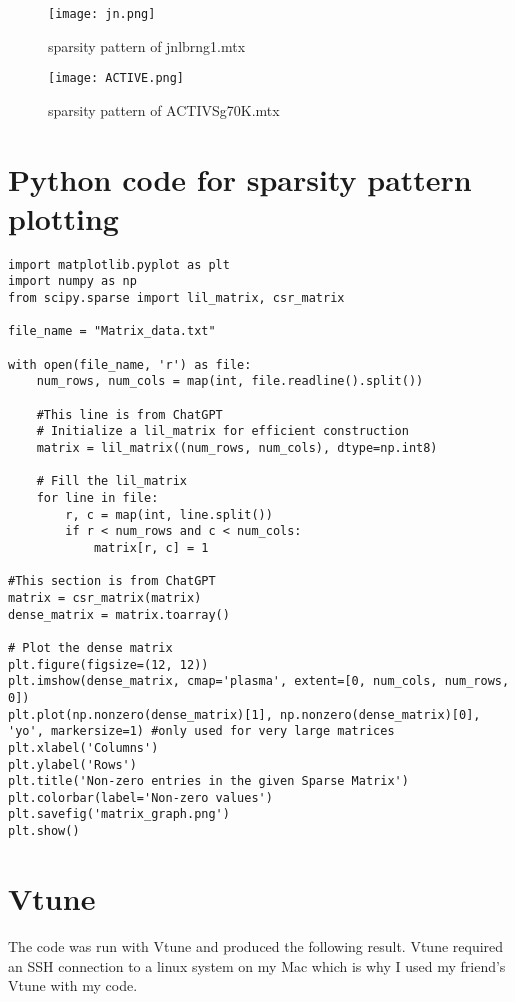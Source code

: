 \documentclass[12pt]{article}
\begin{document}
\begin{figure}[H]
    \centering
    \texttt{[image: jn.png]}
    \caption{sparsity pattern of jnlbrng1$.$mtx}
    \label{fig:enter-label}
\end{figure}

\begin{figure} [H]
    \centering
    \texttt{[image: ACTIVE.png]}
    \caption{sparsity pattern of ACTIVSg70K$.$mtx}
    \label{fig:enter-label}
\end{figure}

\section{Python code for sparsity pattern plotting}
	\begin{lstlisting}
import matplotlib.pyplot as plt
import numpy as np
from scipy.sparse import lil_matrix, csr_matrix

file_name = "Matrix_data.txt"

with open(file_name, 'r') as file:
    num_rows, num_cols = map(int, file.readline().split())

    #This line is from ChatGPT
    # Initialize a lil_matrix for efficient construction
    matrix = lil_matrix((num_rows, num_cols), dtype=np.int8)

    # Fill the lil_matrix
    for line in file:
        r, c = map(int, line.split())
        if r < num_rows and c < num_cols:
            matrix[r, c] = 1

#This section is from ChatGPT
matrix = csr_matrix(matrix)
dense_matrix = matrix.toarray()

# Plot the dense matrix
plt.figure(figsize=(12, 12))
plt.imshow(dense_matrix, cmap='plasma', extent=[0, num_cols, num_rows, 0])
plt.plot(np.nonzero(dense_matrix)[1], np.nonzero(dense_matrix)[0], 'yo', markersize=1) #only used for very large matrices
plt.xlabel('Columns')
plt.ylabel('Rows')
plt.title('Non-zero entries in the given Sparse Matrix')
plt.colorbar(label='Non-zero values')
plt.savefig('matrix_graph.png')
plt.show()

	\end{lstlisting}

\section{Vtune}
The code was run with Vtune and produced the following result. Vtune required an SSH connection to a linux system on my Mac which is why I used my friend's Vtune with my code. 
\end{document}

